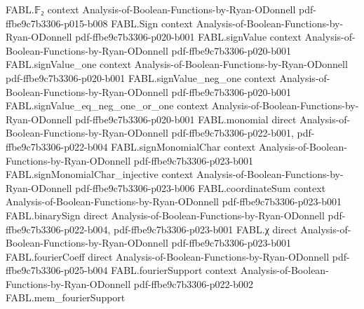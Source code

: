 \begin{theorem}
\label{FABL.measure_restrictedFourierWeightEstimatorOutput_failure_le}
\leanok
{}
\proofstep
  {FABL.𝔽₂}
  {context}
  {Analysis-of-Boolean-Functions-by-Ryan-ODonnell}
  {pdf-ffbe9c7b3306-p015-b008}
\proofstep
  {FABL.Sign}
  {context}
  {Analysis-of-Boolean-Functions-by-Ryan-ODonnell}
  {pdf-ffbe9c7b3306-p020-b001}
\proofstep
  {FABL.signValue}
  {context}
  {Analysis-of-Boolean-Functions-by-Ryan-ODonnell}
  {pdf-ffbe9c7b3306-p020-b001}
\proofstep
  {FABL.signValue_one}
  {context}
  {Analysis-of-Boolean-Functions-by-Ryan-ODonnell}
  {pdf-ffbe9c7b3306-p020-b001}
\proofstep
  {FABL.signValue_neg_one}
  {context}
  {Analysis-of-Boolean-Functions-by-Ryan-ODonnell}
  {pdf-ffbe9c7b3306-p020-b001}
\proofstep
  {FABL.signValue_eq_neg_one_or_one}
  {context}
  {Analysis-of-Boolean-Functions-by-Ryan-ODonnell}
  {pdf-ffbe9c7b3306-p020-b001}
\proofstep
  {FABL.monomial}
  {direct}
  {Analysis-of-Boolean-Functions-by-Ryan-ODonnell}
  {pdf-ffbe9c7b3306-p022-b001,
    pdf-ffbe9c7b3306-p022-b004}
\proofstep
  {FABL.signMonomialChar}
  {context}
  {Analysis-of-Boolean-Functions-by-Ryan-ODonnell}
  {pdf-ffbe9c7b3306-p023-b001}
\proofstep
  {FABL.signMonomialChar_injective}
  {context}
  {Analysis-of-Boolean-Functions-by-Ryan-ODonnell}
  {pdf-ffbe9c7b3306-p023-b006}
\proofstep
  {FABL.coordinateSum}
  {context}
  {Analysis-of-Boolean-Functions-by-Ryan-ODonnell}
  {pdf-ffbe9c7b3306-p023-b001}
\proofstep
  {FABL.binarySign}
  {direct}
  {Analysis-of-Boolean-Functions-by-Ryan-ODonnell}
  {pdf-ffbe9c7b3306-p022-b004,
    pdf-ffbe9c7b3306-p023-b001}
\proofstep
  {FABL.χ}
  {direct}
  {Analysis-of-Boolean-Functions-by-Ryan-ODonnell}
  {pdf-ffbe9c7b3306-p023-b001}
\proofstep
  {FABL.fourierCoeff}
  {direct}
  {Analysis-of-Boolean-Functions-by-Ryan-ODonnell}
  {pdf-ffbe9c7b3306-p025-b004}
\proofstep
  {FABL.fourierSupport}
  {context}
  {Analysis-of-Boolean-Functions-by-Ryan-ODonnell}
  {pdf-ffbe9c7b3306-p022-b002}
\proofstep
  {FABL.mem_fourierSupport}

\end{theorem}
